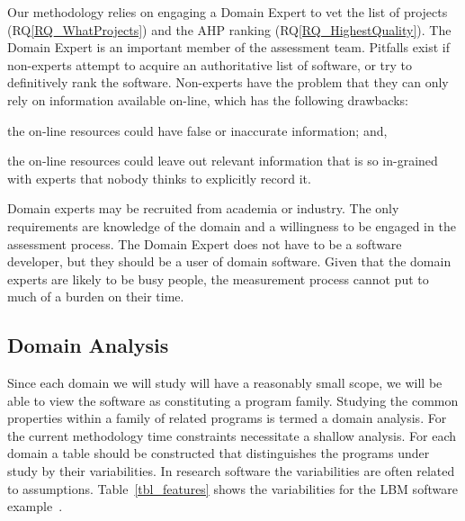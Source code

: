 \documentclass[runningheads]{llncs}
\newcommand{\rqref}[1]{RQ\ref{#1}}
\begin{document}
Our methodology relies on engaging a Domain Expert to vet the list of projects
(\rqref{RQ_WhatProjects}) and the AHP ranking (\rqref{RQ_HighestQuality}).  The
Domain Expert is an important member of the assessment
team. Pitfalls exist if non-experts attempt to acquire an authoritative list of
software, or try to definitively rank the software. Non-experts have the problem
that they can only rely on information available on-line, which has the
following drawbacks:
\begin{inparaenum}[i)]
  \item the on-line resources could have false or inaccurate information; and,
  \item the on-line resources could leave out relevant information that is so
in-grained with experts that nobody thinks to explicitly record it.
\end{inparaenum}
Domain experts may be recruited from academia or industry.  The only
requirements are knowledge of the domain and a willingness to be engaged in the
assessment process.  The Domain Expert does not have to be a software developer,
but they should be a user of domain software.  Given that the domain experts are
likely to be busy people, the measurement process cannot put to much of a burden
on their time.

\subsection{Domain Analysis} \label{SecDomainAnalysis}

Since each domain we will study will have a reasonably small scope, we will be
able to view the software as constituting a program family. Studying the common
properties within a family of related programs is termed a domain analysis.  For
the current methodology time constraints necessitate a shallow analysis. For
each domain a table should be constructed that distinguishes the programs under
study by their variabilities.  In research software the variabilities are often
related to assumptions.  Table~\ref{tbl_features} shows the variabilities for
the LBM software example~\cite{Michalski2021}.
\end{document}
